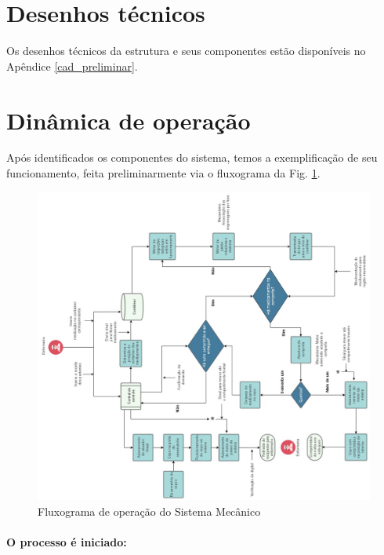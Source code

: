 
\section{Desenhos técnicos}
Os desenhos técnicos da estrutura e seus componentes estão disponíveis no Apêndice \ref{cad_preliminar}.

\section{Dinâmica de operação}
\label{sec:dinamica_operacao}

Após identificados os componentes do sistema, temos a exemplificação de seu funcionamento, feita preliminarmente via o fluxograma da Fig. \ref{fig:FEst}.

\begin{figure}[ht] %
        \centering
        \includegraphics[width=1\textwidth, angle = -90]{figuras/estrutura/FEstrV35.jpg}
        \caption{Fluxograma de operação do Sistema Mecânico}
        \label{fig:FEst}
    \end{figure}

\paragraph*{O processo é iniciado:}

